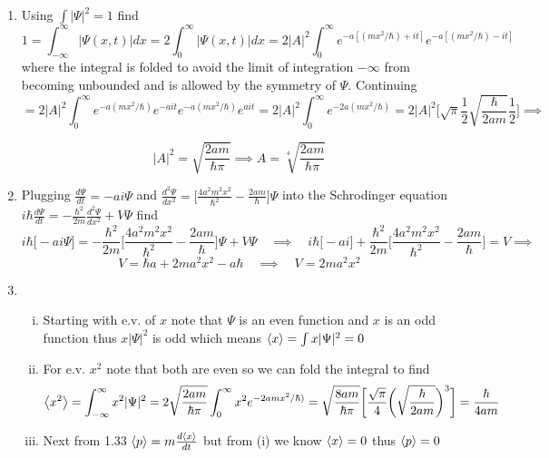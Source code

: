 \documentclass[12pt]{exam}
\begin{document}
\begin{solution}
    \begin{enumerate}
        \item Using $\int |\Psi|^2 = 1$ find 
        $$
        1 = \int^\infty_{-\infty} |\Psi(x,t)|dx = 2\int^\infty_0 |\Psi(x,t)|dx = 2|A|^2\int^\infty_0 e^{-a[(mx^2/\hbar)+it]} e^{-a[(mx^2/\hbar)-it]}$$ 
        where the integral is folded to avoid the limit of integration $-\infty$  from becoming unbounded and is allowed by the symmetry of $\Psi$. Continuing
        $$
        = 2|A|^2\int^\infty_0 e^{-a(mx^2/\hbar)}e^{-ait} e^{-a(mx^2/\hbar)}e^{ait} = 2|A|^2\int^\infty_0 e^{-2a(mx^2/\hbar)} 
        = 2|A|^2\bigg[\sqrt{\pi}\frac{1}{2}\sqrt{\frac{\hbar}{2am}}\frac{1}{2}\bigg] \implies
        $$
        
        $$
        |A|^2 = \sqrt{\frac{2am}{\hbar\pi}} \implies A = \sqrt[4]{\frac{2am}{\hbar\pi}}
        $$

        \item Plugging $\frac{d\Psi}{dt} = -ai\Psi$ and $\frac{d^2\Psi}{dx^2} = \big[ \frac{4a^2m^2x^2}{\hbar^2} -\frac{2am}{\hbar}\big]\Psi$ into the Schrodinger equation $i\hbar \frac{d\Psi}{dt} = -\frac{\hbar^2}{2m}\frac{d^2\Psi}{dx^2}+V\Psi$ find
        $$
        i\hbar\big[-ai\Psi \big] = -\frac{\hbar^2}{2m}\bigg[ \frac{4a^2m^2x^2}{\hbar^2} -\frac{2am}{\hbar} \bigg]\Psi + V\Psi \quad \implies \quad i\hbar\big[-ai \big] + \frac{\hbar^2}{2m}\bigg[ \frac{4a^2m^2x^2}{\hbar^2}-\frac{2am}{\hbar}\bigg] = V \implies $$
        $$
        V = \hbar a + 2ma^2x^2 -a\hbar \quad \implies \quad V = 2ma^2x^2$$

        \item \begin{enumerate}[(i)]
            \item Starting with e.v. of $x$ note that $\Psi$ is an even function and $x$ is an odd function thus $x|\Psi|^2$ is odd which means $\expval{x} = \int x|\Psi|^2 = 0 $

            \item For e.v. $x^2$ note that both are even so we can fold the integral to find 
            $$
            \expval{x^2} = \int^{\infty}_{-\infty} x^2|\Psi|^2 = 2\sqrt{\frac{2am}{\hbar\pi}} \int^\infty_0 x^2e^{-2amx^2/\hbar)} = \sqrt{\frac{8am}{\hbar\pi}} \bigg[ \frac{\sqrt{\pi}}{4}\bigg(\sqrt{\frac{\hbar}{2am}}\bigg)^3\bigg] = \frac{\hbar}{4am}
            $$

            \item Next from 1.33 $\expval{p} = m \frac{d\expval{x}}{dt}$ but from (i) we know $\expval{x} = 0$ thus $\expval{p} = 0$


\end{enumerate}
\end{enumerate}
\end{solution}
\end{document}
